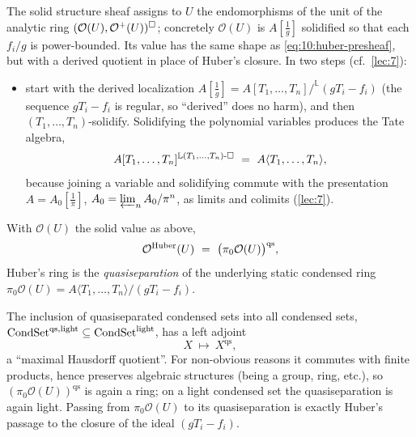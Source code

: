\begin{remark}
\label{rmk:10:solid-value}
The solid structure sheaf assigns to $U$ the endomorphisms of the unit of the
analytic ring $(\mathcal O(U),\mathcal O^{+}(U))^{\square}$; concretely
$\mathcal O(U)$ is $A[\tfrac1g]$ solidified so that each $f_{i}/g$ is
power-bounded. Its value has the same shape as \eqref{eq:10:huber-presheaf}, but
with a derived quotient in place of Huber's closure. In two steps
(cf.\ \cref{lec:7}):
\begin{itemize}
\item start with the derived localization
$A[\tfrac1g]=A[T_{1},\dots,T_{n}]/^{\mathbb{L}}(gT_{i}-f_{i})$ (the sequence
$gT_{i}-f_{i}$ is regular, so ``derived'' does no harm), and then
$(T_{1},\dots,T_{n})$-solidify. Solidifying the polynomial variables produces the
Tate algebra,
\begin{equation*}
A[T_{1},\dots,T_{n}]^{\mathbb{L}(T_{1},\dots,T_{n})\text{-}\solid}\ =\
A\langle T_{1},\dots,T_{n}\rangle,
\end{equation*}
because joining a variable and solidifying commute with the presentation
$A=A_{0}[\tfrac1\pi]$, $A_{0}=\varprojlim_{n}A_{0}/\pi^{n}$, as limits and
colimits (\cref{lec:7}).
\end{itemize}
\end{remark}

\begin{corollary}[Huber $=$ quasiseparation of $\pi_{0}$ of the solid value]
\label{cor:10:huber-quasisep}
With $\mathcal O(U)$ the solid value as above,
\begin{equation*}
\Ohub(U)\ =\ \bigl(\pi_{0}\mathcal O(U)\bigr)^{\mathrm{qs}},
\end{equation*}
Huber's ring is the \emph{quasiseparation} of the underlying static condensed ring
$\pi_{0}\mathcal O(U)=A\langle T_{1},\dots,T_{n}\rangle/(gT_{i}-f_{i})$.
\end{corollary}

\begin{remark}
\label{rmk:10:qs-functor}
The inclusion of quasiseparated condensed sets into all condensed sets,
$\mathrm{CondSet}^{\mathrm{qs},\mathrm{light}}\subseteq\mathrm{CondSet}^{\mathrm{light}}$, has a left adjoint
\begin{equation*}
X\ \longmapsto\ X^{\mathrm{qs}},
\end{equation*}
a ``maximal Hausdorff quotient''. For non-obvious reasons it commutes with finite
products, hence preserves algebraic structures (being a group, ring, etc.), so
$(\pi_{0}\mathcal O(U))^{\mathrm{qs}}$ is again a ring; on a light condensed set
the quasiseparation is again light. Passing from $\pi_{0}\mathcal O(U)$ to its
quasiseparation is exactly Huber's passage to the closure of the ideal
$(gT_{i}-f_{i})$.
\end{remark}

